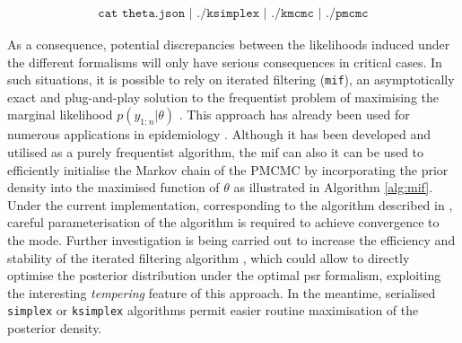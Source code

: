 \documentclass[a4paper,11pt,titlepage]{article}
\theoremstyle{plain} %
\begin{document}
\begin{align}
\texttt{cat theta.json | ./ksimplex | ./kmcmc | ./pmcmc}\nonumber
\end{align}


As a consequence, potential discrepancies between the likelihoods induced under the different formalisms will only have serious consequences in  critical cases. In such situations, it is possible to rely on iterated filtering (\texttt{mif}), an asymptotically exact and plug-and-play  solution to the frequentist problem of  maximising the marginal likelihood $p(y_{1:n}|\theta)$ \citep{Ionides2006,Breto2009,Ionides2011}. This approach has already been used for numerous applications in epidemiology \citep{Ionides2006,King2008,Breto2009,Laneri2010,He2010,Camacho2011,He2011}. Although it has been developed and utilised as a purely frequentist algorithm,  the mif  can also it can  be used to efficiently initialise the Markov chain of the PMCMC by incorporating the prior density into the maximised function of $\theta$ as illustrated in Algorithm \ref{alg:mif}.  Under the current implementation, corresponding to the algorithm described in \cite{Breto2009}, careful parameterisation of the algorithm is required to achieve convergence to the mode. Further investigation is being carried out to increase the efficiency and stability of the iterated filtering algorithm \citep{Ionides2012,Lindstrom2013}, which could allow to directly optimise the posterior distribution under the optimal psr formalism, exploiting the interesting \emph{tempering} feature of this approach. In the meantime, serialised \texttt{simplex} or \texttt{ksimplex} algorithms permit easier routine maximisation of the posterior density.
\end{document}
